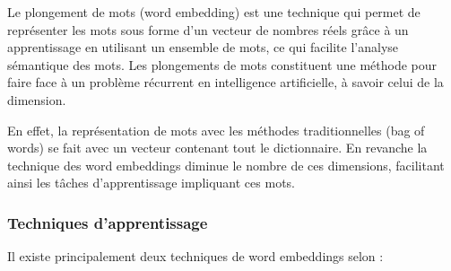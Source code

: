    Le plongement de mots (word embedding) est une technique qui permet de représenter les mots sous forme d'un vecteur de nombres réels grâce à un apprentissage en utilisant un ensemble de mots, ce qui facilite l'analyse sémantique des mots. Les plongements de mots constituent une méthode pour faire face à un problème récurrent en intelligence artificielle, à savoir celui de la dimension. 

    En effet, la représentation de mots avec les méthodes traditionnelles (bag of words) se fait avec un vecteur contenant tout le dictionnaire. En revanche la technique des word embeddings diminue le nombre de ces dimensions, facilitant ainsi les tâches d'apprentissage impliquant ces mots.
    
    
    \subsubsection{Techniques d'apprentissage}
    
    Il existe principalement deux techniques de word embeddings selon \cite{we1} :
    
